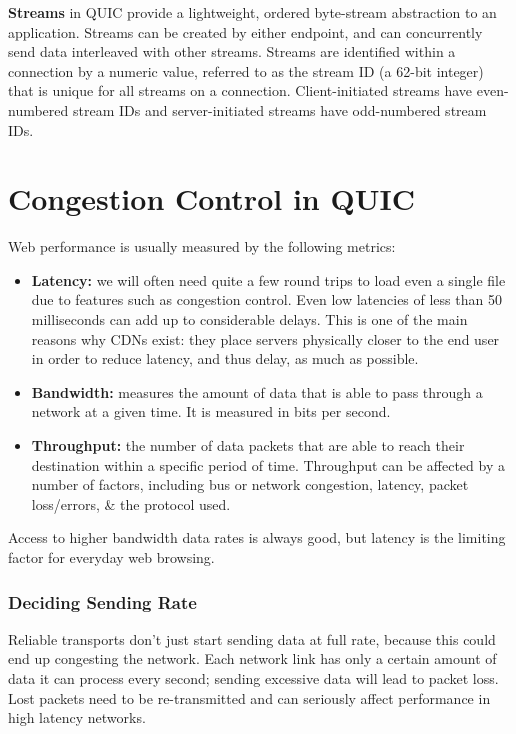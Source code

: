 \documentclass[a4paper,11pt]{article}
\begin{document}
\textbf{Streams} in QUIC provide a lightweight, ordered byte-stream abstraction to an application.
Streams can be created by either endpoint, and can concurrently send data interleaved with other streams.
Streams are identified within a connection by a numeric value, referred to as the stream ID (a 62-bit integer) that is unique for all streams on a connection.
Client-initiated streams have even-numbered stream IDs and server-initiated streams have odd-numbered stream IDs.

\section{Congestion Control in QUIC}
Web performance is usually measured by the following metrics:
\begin{itemize}
    \item   \textbf{Latency:} we will often need quite a few round trips to load even a single file due to features such as congestion control.
            Even low latencies of less than 50 milliseconds can add up to considerable delays.
            This is one of the main reasons why CDNs exist: they place servers physically closer to the end user in order to reduce latency, and thus delay, as much as possible.

    \item   \textbf{Bandwidth:} measures the amount of data that is able to pass through a network at a given time.
            It is measured in bits per second.

    \item   \textbf{Throughput:} the number of data packets that are able to reach their destination within a specific period of time.
            Throughput can be affected by a number of factors, including bus or network congestion, latency, packet loss/errors, \& the protocol used.
\end{itemize}

Access to higher bandwidth data rates is always good, but latency is the limiting factor for everyday web browsing.

\subsubsection{Deciding Sending Rate}
Reliable transports don't just start sending data at full rate, because this could end up congesting the network.
Each network link has only a certain amount of data it can process every second;
sending excessive data will lead to packet loss.
Lost packets need to be re-transmitted and can seriously affect performance in high latency networks.
\end{document}
